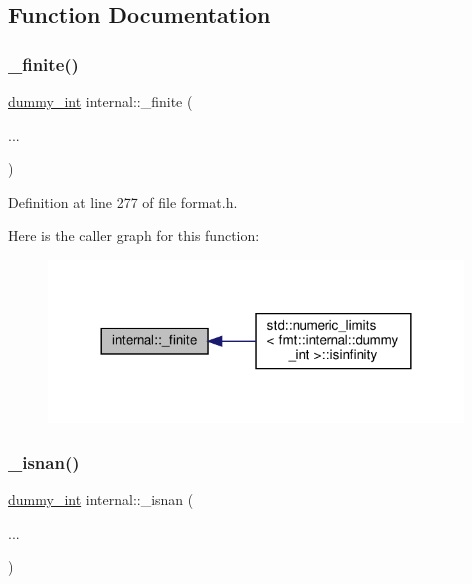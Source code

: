 \subsection{Function Documentation}
\mbox{\label{namespaceinternal_a46665e2f4ec2c5f429bae100fe461b47}} 
\subsubsection{\texorpdfstring{\+\_\+finite()}{\_finite()}}
{\footnotesize\ttfamily \hyperlink{structinternal_1_1dummy__int}{dummy\+\_\+int} internal\+::\+\_\+finite (\begin{DoxyParamCaption}\item[{}]{... }\end{DoxyParamCaption})\hspace{0.3cm}{\ttfamily [inline]}}



Definition at line 277 of file format.\+h.

Here is the caller graph for this function\+:
\nopagebreak
\begin{figure}[H]
\begin{center}
\leavevmode
\includegraphics[width=312pt]{namespaceinternal_a46665e2f4ec2c5f429bae100fe461b47_icgraph}
\end{center}
\end{figure}
\mbox{\label{namespaceinternal_a29338fd1e0c44c56648c890308cdf0e0}} 
\subsubsection{\texorpdfstring{\+\_\+isnan()}{\_isnan()}}
{\footnotesize\ttfamily \hyperlink{structinternal_1_1dummy__int}{dummy\+\_\+int} internal\+::\+\_\+isnan (\begin{DoxyParamCaption}\item[{}]{... }\end{DoxyParamCaption})\hspace{0.3cm}{\ttfamily [inline]}}



